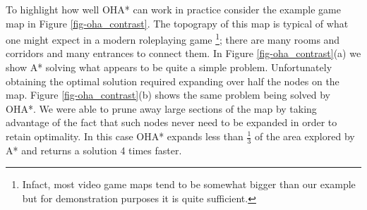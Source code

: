 To highlight how well OHA* can work in practice consider the example game map in Figure 
\ref{fig-oha_contrast}. 
The topograpy of this map is typical of what one might expect in a modern roleplaying game
\footnote{Infact, most video game maps tend to be somewhat bigger than our example but for demonstration 
purposes it is quite sufficient.};
there are many rooms and corridors and many entrances to connect them.
In Figure \ref{fig-oha_contrast}(a) we show A* solving what appears to be quite a simple problem. 
Unfortunately obtaining the optimal solution required expanding over half the nodes on the map.
Figure \ref{fig-oha_contrast}(b) shows the same problem being solved by OHA*.
We were able to prune away large sections of the map by taking advantage of the fact that
such nodes never need to be expanded in order to retain optimality.
In this case OHA* expands less than $\frac{1}{3}$ of the area explored by A* and returns
a solution 4 times faster.


